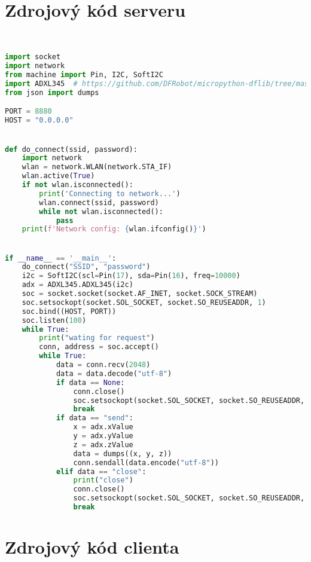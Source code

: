 \documentclass[12pt]{report}			%
\begin{document}
	\nocite{*}
    	\printbibliography					
    \printglossary[title={Zkratky}]		
    \listoffigures					
						

    \begin{appendices}
	\chapter{Zdrojový kód serveru}
	
\begin{lstlisting}[title={Program server.py}, caption={server.py},  label={lst:server}, language=Python]


import socket
import network
from machine import Pin, I2C, SoftI2C
import ADXL345  # https://github.com/DFRobot/micropython-dflib/tree/master/ADXL345
from json import dumps

PORT = 8880
HOST = "0.0.0.0"


def do_connect(ssid, password):
    import network
    wlan = network.WLAN(network.STA_IF)
    wlan.active(True)
    if not wlan.isconnected():
        print('Connecting to network...')
        wlan.connect(ssid, password)
        while not wlan.isconnected():
            pass
    print(f'Network config: {wlan.ifconfig()}')


if __name__ == '__main__':
    do_connect("SSID", "password")
    i2c = SoftI2C(scl=Pin(17), sda=Pin(16), freq=10000)
    adx = ADXL345.ADXL345(i2c)
    soc = socket.socket(socket.AF_INET, socket.SOCK_STREAM)
    soc.setsockopt(socket.SOL_SOCKET, socket.SO_REUSEADDR, 1)
    soc.bind((HOST, PORT))
    soc.listen(100)
    while True:
        print("wating for request")
        conn, address = soc.accept()
        while True:
            data = conn.recv(2048)
            data = data.decode("utf-8")
            if data == None:
                conn.close()
                soc.setsockopt(socket.SOL_SOCKET, socket.SO_REUSEADDR, 1)
                break
            if data == "send":
                x = adx.xValue
                y = adx.yValue
                z = adx.zValue
                data = dumps((x, y, z))
                conn.sendall(data.encode("utf-8"))
            elif data == "close":
                print("close")
                conn.close()
                soc.setsockopt(socket.SOL_SOCKET, socket.SO_REUSEADDR, 1)
                break


\end{lstlisting}

	\chapter{Zdrojový kód clienta}


\end{appendices}
\end{document}
